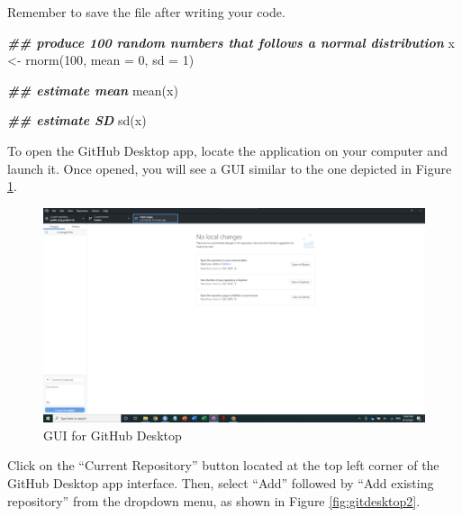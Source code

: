 \documentclass[
]{book}
\newenvironment{Shaded}{\begin{snugshade}}{\end{snugshade}}
\newcommand{\AttributeTok}[1]{\textcolor[rgb]{0.77,0.63,0.00}{#1}}
\newcommand{\DecValTok}[1]{\textcolor[rgb]{0.00,0.00,0.81}{#1}}
\newcommand{\DocumentationTok}[1]{\textcolor[rgb]{0.56,0.35,0.01}{\textbf{\textit{#1}}}}
\newcommand{\FunctionTok}[1]{\textcolor[rgb]{0.00,0.00,0.00}{#1}}
\newcommand{\NormalTok}[1]{#1}
\newcommand{\OtherTok}[1]{\textcolor[rgb]{0.56,0.35,0.01}{#1}}
\begin{document}
Remember to save the file after writing your code.

\begin{Shaded}
\begin{Highlighting}[]
\DocumentationTok{\#\# produce 100 random numbers that follows a normal distribution}
\NormalTok{x }\OtherTok{\textless{}{-}} \FunctionTok{rnorm}\NormalTok{(}\DecValTok{100}\NormalTok{, }\AttributeTok{mean =} \DecValTok{0}\NormalTok{, }\AttributeTok{sd =} \DecValTok{1}\NormalTok{)}

\DocumentationTok{\#\# estimate mean}
\FunctionTok{mean}\NormalTok{(x)}

\DocumentationTok{\#\# estimate SD}
\FunctionTok{sd}\NormalTok{(x)}
\end{Highlighting}
\end{Shaded}

To open the GitHub Desktop app, locate the application on your computer and launch it. Once opened, you will see a GUI similar to the one depicted in Figure \ref{fig:gitdesktop1}.

\begin{figure}

{\centering \includegraphics[width=61.11in]{image/git_image02} 

}

\caption{GUI for GitHub Desktop}\label{fig:gitdesktop1}
\end{figure}

Click on the ``Current Repository'' button located at the top left corner of the GitHub Desktop app interface. Then, select ``Add'' followed by ``Add existing repository'' from the dropdown menu, as shown in Figure \ref{fig:gitdesktop2}.
\end{document}
